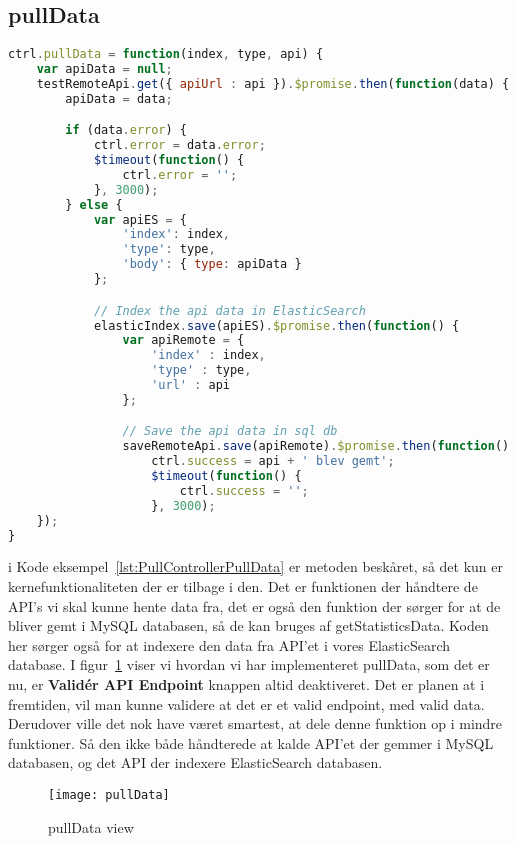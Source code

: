 \subsection{pullData}
\begin{lstlisting}[caption={pullData}, language={JavaScript}, label={lst:PullControllerPullData}]
ctrl.pullData = function(index, type, api) {
    var apiData = null;
    testRemoteApi.get({ apiUrl : api }).$promise.then(function(data) {
        apiData = data;

        if (data.error) {
            ctrl.error = data.error;
            $timeout(function() {
                ctrl.error = '';
            }, 3000);
        } else {
            var apiES = {
                'index': index,
                'type': type,
                'body': { type: apiData }
            };

            // Index the api data in ElasticSearch
            elasticIndex.save(apiES).$promise.then(function() {
                var apiRemote = {
                    'index' : index,
                    'type' : type,
                    'url' : api
                };

                // Save the api data in sql db
                saveRemoteApi.save(apiRemote).$promise.then(function() {
                    ctrl.success = api + ' blev gemt';
                    $timeout(function() {
                        ctrl.success = '';
                    }, 3000);
    });
}
\end{lstlisting}
i Kode eksempel~\ref{lst:PullControllerPullData} er metoden beskåret, så det kun er kernefunktionaliteten der er tilbage i den.
Det er funktionen der håndtere de API's vi skal kunne hente data fra, det er også den funktion der sørger for at de bliver gemt 
i MySQL databasen, så de kan bruges af getStatisticsData. Koden her sørger også for at indexere den data fra API'et i vores ElasticSearch
database.
I figur~\ref{fig:pullData} viser vi hvordan vi har implementeret pullData, som det er nu, er \textbf{Validér API Endpoint} knappen altid deaktiveret. 
Det er planen at i fremtiden, vil man kunne validere at det er et valid endpoint, med valid data.
Derudover ville det nok have været smartest, at dele denne funktion op i mindre funktioner. Så den ikke både håndterede at kalde API'et der gemmer i MySQL databasen,
og det API der indexere ElasticSearch databasen.
\begin{figure}[H]
     \centering
     \texttt{[image: pullData]}
     \caption{pullData view}
     \label{fig:pullData}
\end{figure}
